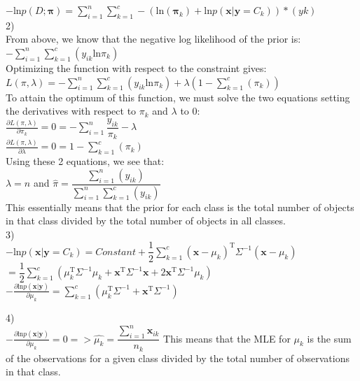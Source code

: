 \documentclass[submit]{harvardml}
\begin{document}
$-\textrm{ln} p(D; \boldsymbol{\pi})= \sum_{i=1}^{n}\sum_{k=1}^{c}-(\textrm{ln} (\boldsymbol{\pi}_k) + \textrm{ln} p(\textbf{x}|\textbf{y}=C_k))*(yk)$\\

2)\\
From above, we know that the negative log likelihood of the prior is:\\
$-\sum_{i=1}^{n}\sum_{k=1}^{c}(y_{ik}\textrm{ln}\pi_k)$\\
Optimizing the function with respect to the constraint gives:\\
$L(\pi,\lambda) = -\sum_{i=1}^{n}\sum_{k=1}^{c}(y_{ik}\textrm{ln}\pi_k) + \lambda(1-\sum_{k=1}^{c}(\pi_k))$\\
To attain the optimum of this function, we must solve the two equations setting the derivatives with respect to $\pi_k$ and $\lambda$ to 0:\\
$\frac{\partial L(\pi,\lambda)}{\partial \pi_k}= 0 = -\sum_{i=1}^{n}\dfrac{y_{ik}}{\pi_k} -\lambda$ \\
$\frac{\partial L(\pi,\lambda)}{\partial \lambda}= 0 = 1-\sum_{k=1}^{c}(\pi_k)$ \\
Using these 2 equations, we see that:\\
$\lambda = n$ and $\hat{\pi} = \dfrac{\sum_{i=1}^{n}(y_{ik})}{\sum_{i=1}^{n}\sum_{k=1}^{c}(y_{ik})}$\\
This essentially means that the prior for each class is the total number of objects in that class divided by the total number of objects in all classes.\\

3)\\
$-\textrm{ln}p(\textbf{x}|\textbf{y} = C_k) =  Constant + \dfrac{1}{2}\sum_{k=1}^{c}(\textbf{x}-\mu_k)^{\textrm{T}}\Sigma^{-1}(\textbf{x}-\mu_k)$\\
$=\dfrac{1}{2}\sum_{k=1}^{c}(\mu_k^{\textrm{T}}\Sigma^{-1}\mu_k + \textbf{x}^{\textrm{T}}\Sigma^{-1}\textbf{x} + 2\textbf{x}^{\textrm{T}}\Sigma^{-1}\mu_k)$\\
$-\frac{\partial \textrm{ln}p(\textbf{x}|\textbf{y})}{\partial \mu_k} =  \sum_{k=1}^{c}(\mu_k^{\textrm{T}}\Sigma^{-1} + \textbf{x}^{\textrm{T}}\Sigma^{-1})$

4)\\
$-\frac{\partial \textrm{ln}p(\textbf{x}|\textbf{y})}{\partial \mu_k} = 0 => \hat{\mu_k} = \dfrac{\sum_{i=1}^{n}\textbf{x}_{ik}}{n_k}$
This means that the MLE for $\mu_k$ is the sum of the observations for a given class divided by the total number of observations in that class.
\end{document}
